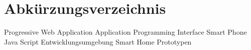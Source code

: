 \chapter*{Abkürzungsverzeichnis}
\pagestyle{plain}

\begin{acronym}[AUTOSAR]

   				{Progressive Web Application}
  				{Application Programming Interface}
  				{Smart Phone}
  				{Java Script}
  				{Entwicklungsumgebung}
  				{Smart Home Prototypen}
\end{acronym}
